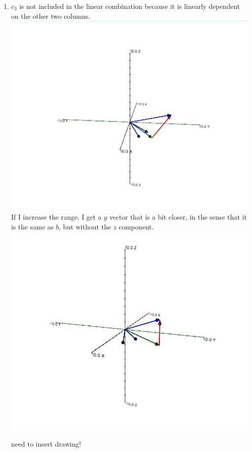 \documentclass{article}
\begin{document}
\begin{enumerate}
\item $c_3$ is not included in the linear combination because it is linearly dependent on the other two columns. \\
\includegraphics[scale=0.3]{exercise2_1}\\
If I increase the range, I get a $y$ vector that is a bit closer, in the sense that it is the same as $b$, but without the $z$ component. \\
\includegraphics[scale=0.3]{exercise2_new_range}

need to insert drawing!


\end{enumerate}
\end{document}
